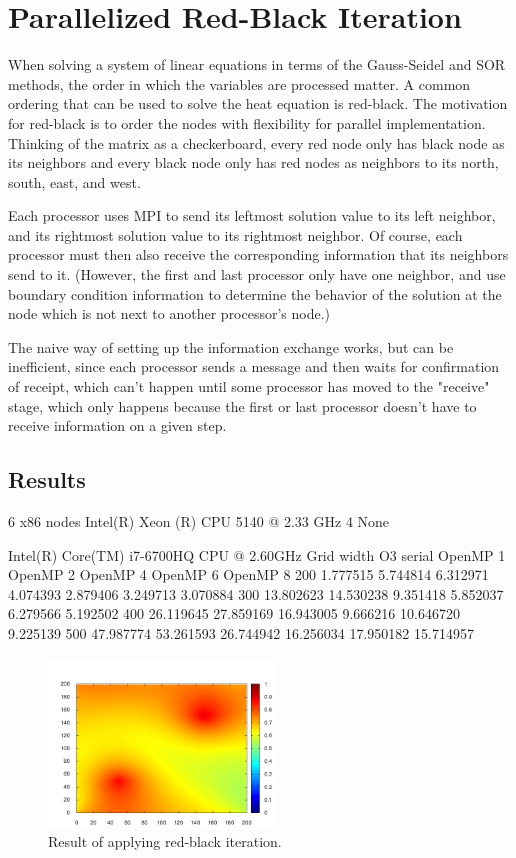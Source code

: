 \documentclass[paper=a4, fontsize=11pt]{scrartcl} %
\numberwithin{equation}{section} %
\numberwithin{figure}{section} %
\numberwithin{table}{section} %
\begin{document}
\section{Parallelized Red-Black Iteration}
When solving a system of linear equations in terms of the Gauss-Seidel and SOR methods, the order in which the variables are processed matter. A common ordering that can be used to solve the heat equation is red-black. The motivation for red-black is to order the nodes with flexibility for parallel implementation. Thinking of the matrix as a checkerboard, every red node only has black node as its neighbors and every black node only has red nodes as neighbors to its north, south, east, and west.

Each processor uses MPI to send its leftmost solution value to its left neighbor, and its rightmost solution value to its rightmost neighbor. Of course, each processor must then also receive the corresponding information that its neighbors send to it. (However, the first and last processor only have one neighbor, and use boundary condition information to determine the behavior of the solution at the node which is not next to another processor's node.)

The naive way of setting up the information exchange works, but can be inefficient, since each processor sends a message and then waits for confirmation of receipt, which can't happen until some processor has moved to the "receive" stage, which only happens because the first or last processor doesn't have to receive information on a given step.

\subsection{Results}

6 x86 nodes	Intel(R) Xeon (R) CPU 5140 @ 2.33 GHz	4	None


Intel(R) Core(TM) i7-6700HQ CPU @ 2.60GHz
Grid width O3 serial OpenMP 1 OpenMP 2 OpenMP 4 OpenMP 6 OpenMP 8
200	1.777515 5.744814 6.312971 4.074393 2.879406 3.249713 3.070884
300 13.802623 14.530238 9.351418 5.852037 6.279566 5.192502
400 26.119645 27.859169 16.943005 9.666216 10.646720 9.225139 
500 47.987774 53.261593 26.744942 16.256034 17.950182 15.714957

\begin{figure}
\includegraphics[width=60mm]{heatmap.png}
\caption{Result of applying red-black iteration.}
\label{fig:heatmap}
\end{figure}
\end{document}
